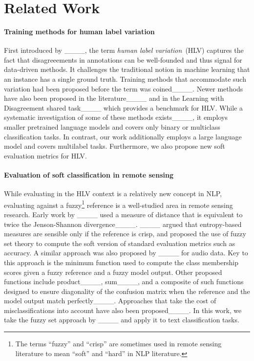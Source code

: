 \section{Related Work}
\label{sec:related-work}

\paragraph{Training methods for human label variation}

First introduced by ____, the term \textit{human label
  variation}~(HLV) captures the fact that disagreeements in annotations can be
well-founded and thus signal for data-driven methods. It challenges the
traditional notion in machine learning that an instance has a single ground
truth. Training methods that accommodate such variation had been proposed before
the term was coined____.
Newer methods have also been proposed in the
literature____ and in the
Learning with Disagreement shared task____ which provides a
benchmark for HLV. While a systematic investigation of some of these methods
exists____, it employs smaller pretrained language models and covers
only binary or multiclass classification tasks. In contrast, our work
additionally employs a large language model and covers multilabel tasks.
Furthermore, we also propose new soft evaluation metrics for HLV.

\paragraph{Evaluation of soft classification in remote sensing}

While evaluating in the HLV context is a relatively new concept in NLP,
evaluating against a fuzzy\footnote{The terms ``fuzzy'' and ``crisp'' are sometimes
  used in remote sensing literature to mean ``soft'' and ``hard'' in NLP
  literature.} reference is a well-studied area in remote sensing research.
Early work by ____ used a measure of distance that is equivalent to
twice the Jenson-Shannon divergence____. ____ argued
that entropy-based measures are sensible only if the reference is crisp, and
proposed the use of fuzzy set theory to compute the soft version of standard
evaluation metrics such as accuracy. A similar approach was also proposed by
____ for audio data. Key to this approach is the minimum function
used to compute the class membership scores given a fuzzy reference and a fuzzy
model output. Other proposed functions include product____,
sum____, and a composite of such functions designed to ensure
diagonality of the confusion matrix when the reference and the model output
match perfectly____. Approaches that take
the cost of misclassifications into account have also been
proposed____. In this work, we take the fuzzy set approach by
____ and apply it to text classification tasks.